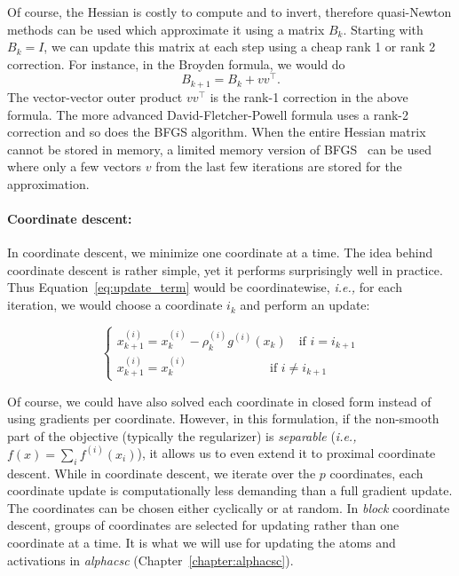 Of course, the Hessian is costly to compute and to invert, therefore quasi-Newton methods can be used which approximate it using a matrix $B_k$. Starting with $B_k = I$, we can update this matrix at each step using a cheap rank 1 or rank 2 correction. For instance, in the Broyden formula, we would do
\begin{equation}
B_{k+1} = B_k + vv^\top.
\end{equation}
The vector-vector outer product $vv^\top$ is the rank-1 correction in the above formula. The more advanced David-Fletcher-Powell formula uses a rank-2 correction and so does the \ac{BFGS} algorithm. When the entire Hessian matrix cannot be stored in memory, a limited memory version of BFGS~\citep{wright1999numerical} can be used where only a few vectors $v$ from the last few iterations are stored for the approximation.

\paragraph{Coordinate descent:}
In coordinate descent, we minimize one coordinate at a time. The idea behind coordinate descent is rather simple, yet it performs surprisingly well in practice. Thus  Equation~\ref{eq:update_term} would be coordinatewise, \textit{i.e.,} for each iteration, we would choose a coordinate $i_k$ and perform an update:

\begin{equation}
\begin{cases}
x^{(i)}_{k+1} = x^{(i)}_{k} - \rho^{(i)}_k g^{(i)}(x_k) \quad \text{if } i=i_{k+1}\\
x^{(i)}_{k+1} = x^{(i)}_{k} \hspace{80pt} \text{if } i \neq i_{k+1}
\end{cases}
\end{equation}

Of course, we could have also solved each coordinate in closed form instead of using gradients per coordinate. However, in this formulation, if the non-smooth part of the objective (typically the regularizer) is \emph{separable} (\textit{i.e.,} $f(x) = \sum_i f^{(i)}(x_i)$), it allows us to even extend it to proximal coordinate descent. While in coordinate descent, we iterate over the $p$ coordinates, each coordinate update is computationally less demanding than a full gradient update. The coordinates can be chosen either cyclically or at random. In \emph{block} coordinate descent, groups of coordinates are selected for updating rather than one coordinate at a time. It is what we will use for updating the atoms and activations in \emph{alphacsc} (Chapter~\ref{chapter:alphacsc}).

